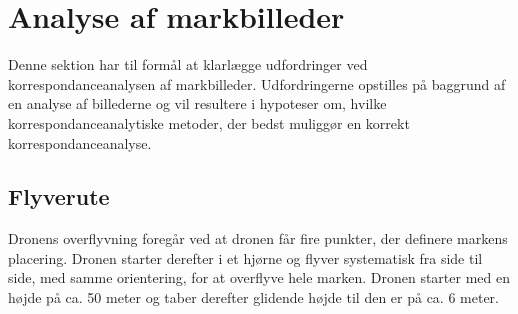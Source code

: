 \chapter{Analyse af markbilleder} \label{sec:mark}
Denne sektion har til formål at klarlægge udfordringer ved korrespondanceanalysen af markbilleder. Udfordringerne opstilles på baggrund af en analyse af billederne og vil resultere i hypoteser om, hvilke korrespondanceanalytiske metoder, der bedst muliggør en korrekt korrespondanceanalyse.
\section{Flyverute}
Dronens overflyvning foregår ved at dronen får fire punkter, der definere markens placering. Dronen starter derefter i et hjørne og flyver systematisk fra side til side, med samme orientering, for at overflyve hele marken. Dronen starter med en højde på ca. 50 meter og taber derefter glidende højde til den er på ca. 6 meter.
